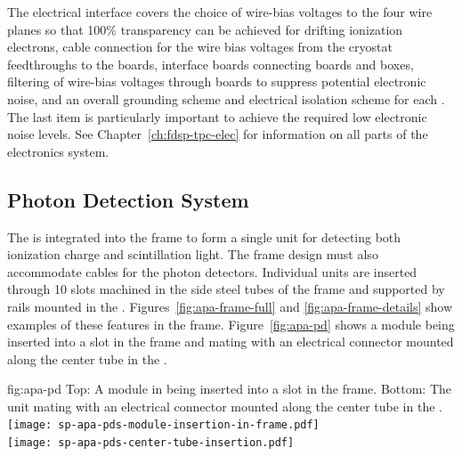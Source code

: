 The electrical interface covers the choice of wire-bias voltages to the four wire planes so that \num{100}\% transparency can be achieved for drifting ionization electrons, cable connection for the wire bias voltages from the cryostat feedthroughs to the  boards, interface boards connecting  boards and  boxes, filtering of wire-bias voltages through  boards to suppress potential electronic noise, and an overall grounding scheme and electrical isolation scheme for each . The last item is particularly important to achieve the required low electronic noise levels.  See Chapter~\ref{ch:fdsp-tpc-elec} for information on all parts of the  electronics system.


\subsection{Photon Detection System}
\label{sec:fdsp-apa-intfc-pds}

The  is integrated into the  frame to form a single unit for detecting both ionization charge and scintillation light.  The  frame design must also accommodate cables for the photon detectors.  %
Individual  units are inserted through \num{10} slots machined in the side steel tubes of the frame and supported by rails mounted in the . Figures~\ref{fig:apa-frame-full} and \ref{fig:apa-frame-details} show examples of these features in the frame. Figure~\ref{fig:apa-pd} shows a  module being inserted into a slot in the frame and mating with an electrical connector mounted along the center tube in the .

\begin{dunefigure}{fig:apa-pd}
{Top: A  module in  being inserted into a slot in the frame. Bottom: The  unit mating with an electrical connector mounted along the center tube in the .
}
\texttt{[image: sp-apa-pds-module-insertion-in-frame.pdf]}\\
\vspace{2mm}
\texttt{[image: sp-apa-pds-center-tube-insertion.pdf]}
\end{dunefigure}

